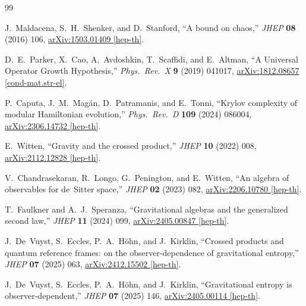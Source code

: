 \documentclass[12pt,a4paper]{article}
\begin{document}
\begin{thebibliography}{99}

J.~Maldacena, S.~H.~Shenker, and D.~Stanford,
``A bound on chaos,''
\textit{JHEP} \textbf{08} (2016) 106,
\href{https://arxiv.org/abs/1503.01409}{arXiv:1503.01409 [hep-th]}.

D.~E.~Parker, X.~Cao, A.~Avdoshkin, T.~Scaffidi, and E.~Altman,
``A Universal Operator Growth Hypothesis,''
\textit{Phys.\ Rev.\ X} \textbf{9} (2019) 041017,
\href{https://arxiv.org/abs/1812.08657}{arXiv:1812.08657 [cond-mat.str-el]}.

P.~Caputa, J.~M.~Mag\'{a}n, D.~Patramanis, and E.~Tonni,
``Krylov complexity of modular Hamiltonian evolution,''
\textit{Phys.\ Rev.\ D} \textbf{109} (2024) 086004,
\href{https://arxiv.org/abs/2306.14732}{arXiv:2306.14732 [hep-th]}.

E.~Witten,
``Gravity and the crossed product,''
\textit{JHEP} \textbf{10} (2022) 008,
\href{https://arxiv.org/abs/2112.12828}{arXiv:2112.12828 [hep-th]}.

V.~Chandrasekaran, R.~Longo, G.~Penington, and E.~Witten,
``An algebra of observables for de~Sitter space,''
\textit{JHEP} \textbf{02} (2023) 082,
\href{https://arxiv.org/abs/2206.10780}{arXiv:2206.10780 [hep-th]}.

T.~Faulkner and A.~J.~Speranza,
``Gravitational algebras and the generalized second law,''
\textit{JHEP} \textbf{11} (2024) 099,
\href{https://arxiv.org/abs/2405.00847}{arXiv:2405.00847 [hep-th]}.

J.~De~Vuyst, S.~Eccles, P.~A.~H\"{o}hn, and J.~Kirklin,
``Crossed products and quantum reference frames: on the observer-dependence
of gravitational entropy,''
\textit{JHEP} \textbf{07} (2025) 063,
\href{https://arxiv.org/abs/2412.15502}{arXiv:2412.15502 [hep-th]}.

J.~De~Vuyst, S.~Eccles, P.~A.~H\"{o}hn, and J.~Kirklin,
``Gravitational entropy is observer-dependent,''
\textit{JHEP} \textbf{07} (2025) 146,
\href{https://arxiv.org/abs/2405.00114}{arXiv:2405.00114 [hep-th]}.


\end{thebibliography}
\end{document}

